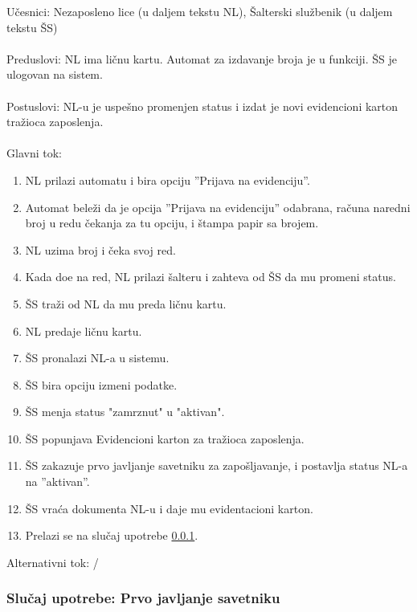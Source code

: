 \noindent  U\v cesnici: Nezaposleno lice (u daljem tekstu NL), \v Salterski slu\v zbenik (u daljem tekstu \v SS)
\\
\\ Preduslovi: NL ima li\v cnu kartu. Automat za izdavanje broja je u funkciji. \v SS je ulogovan na sistem. 
\\
\\ Postuslovi: NL-u je uspe\v sno promenjen status i izdat je novi evidencioni karton tra\v zioca zaposlenja.
\\
\\ Glavni tok:
\begin{enumerate}
	\item NL prilazi automatu i bira opciju ''Prijava na evidenciju''.
	\item Automat bele\v zi da je opcija ''Prijava na evidenciju'' odabrana, ra\v cuna naredni broj u redu \v cekanja za tu opciju, i \v stampa papir sa brojem.
	\item NL uzima broj i \v ceka svoj red.
	\item Kada do\dj e na red, NL prilazi \v salteru i zahteva od \v SS da mu promeni status.
	\item \v SS tra\v zi od NL da mu preda li\v cnu kartu.
	\item NL predaje li\v cnu kartu.
	\item \v SS pronalazi NL-a u sistemu. 
	\item \v SS bira opciju izmeni podatke.
	\item \v SS menja status "zamrznut" u "aktivan".
	\item \v SS popunjava Evidencioni karton za tra\v zioca zaposlenja.
	\item \v SS zakazuje prvo javljanje savetniku za zapo\v sljavanje, i postavlja status NL-a na ''aktivan''.
	\item \v SS vra\' ca dokumenta NL-u i daje mu evidentacioni karton.
	\item Prelazi se na slu\v caj upotrebe \ref{su: prvo javljanje savetniku}.
\end{enumerate}

\noindent Alternativni tok: /

\subsubsection{Slu\v caj upotrebe: Prvo javljanje savetniku}
\label{su: prvo javljanje savetniku}

